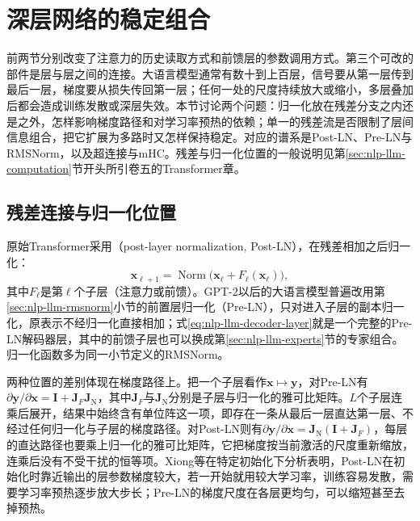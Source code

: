 \section{深层网络的稳定组合}
\label{sec:nlp-llm-layer-composition}

前两节分别改变了注意力的历史读取方式和前馈层的参数调用方式。第三个可改的部件是层与层之间的连接。大语言模型通常有数十到上百层，信号要从第一层传到最后一层，梯度要从损失传回第一层；任何一处的尺度持续放大或缩小，多层叠加后都会造成训练发散或深层失效。本节讨论两个问题：归一化放在残差分支之内还是之外，怎样影响梯度路径和对学习率预热的依赖；单一的残差流是否限制了层间信息组合，把它扩展为多路时又怎样保持稳定。对应的谱系是Post-LN、Pre-LN与RMSNorm，以及超连接与mHC。残差与归一化位置的一般说明见第\ref{sec:nlp-llm-computation}节开头所引卷五的Transformer章。

\subsection{残差连接与归一化位置}
\label{sec:nlp-llm-residual-normalization}

原始Transformer采用（post-layer normalization, Post-LN），在残差相加之后归一化：
\begin{equation}
 \bm x_{\ell+1}=\operatorname{Norm}\bigl(\bm x_\ell+F_\ell(\bm x_\ell)\bigr),
 \label{eq:nlp-llm-post-ln}
\end{equation}
其中$F_\ell$是第$\ell$个子层（注意力或前馈）。GPT-2以后的大语言模型普遍改用第\ref{sec:nlp-llm-rmsnorm}小节的前置层归一化（Pre-LN），只对进入子层的副本归一化，原表示不经归一化直接相加；式\eqref{eq:nlp-llm-decoder-layer}就是一个完整的Pre-LN解码器层，其中的前馈子层也可以换成第\ref{sec:nlp-llm-experts}节的专家组合。归一化函数多为同一小节定义的RMSNorm。

两种位置的差别体现在梯度路径上。把一个子层看作$\bm x\mapsto\bm y$，对Pre-LN有$\partial\bm y/\partial\bm x=\bm I+\bm J_F\bm J_{\mathrm{N}}$，其中$\bm J_F$与$\bm J_{\mathrm N}$分别是子层与归一化的雅可比矩阵。$L$个子层连乘后展开，结果中始终含有单位阵这一项，即存在一条从最后一层直达第一层、不经过任何归一化与子层的梯度路径。对Post-LN则有$\partial\bm y/\partial\bm x=\bm J_{\mathrm N}(\bm I+\bm J_F)$，每层的直达路径也要乘上归一化的雅可比矩阵，它把梯度按当前激活的尺度重新缩放，连乘后没有不受干扰的恒等项。Xiong等在特定初始化下分析表明，Post-LN在初始化时靠近输出的层参数梯度较大，若一开始就用较大学习率，训练容易发散，需要学习率预热逐步放大步长；Pre-LN的梯度尺度在各层更均匀，可以缩短甚至去掉预热。


